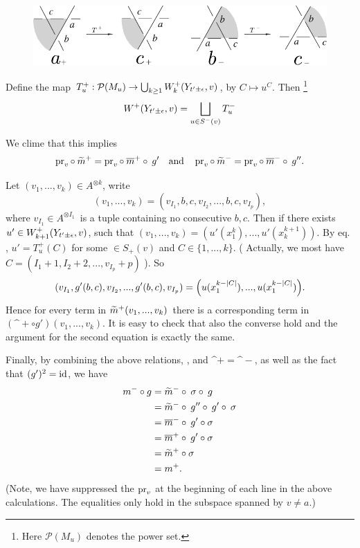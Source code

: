 \begin{figure}[h]
\centering
\includegraphics[width=.6\textwidth]{figs/move_iiib3.pdf}
\caption{}
\label{fig:move_iiib3}
\end{figure}

Define the map $T_u^+ : \mathcal{P}(M_u) \to \bigcup_{k\ge 1} W^+_k(Y_{t'\pm\epsilon},v)$,
by  $C \mapsto u^C$. Then
\footnote{Here $\mathcal{P}(M_u)$ denotes the power set.}
\begin{equation}
\label{eq:sq_union_T}
W^+(Y_{t'\pm\epsilon},v) = \bigsqcup_{u\in S^-(v)} T_u^{-} 
\end{equation}

We clime that this implies 
\begin{equation}
\label{eq:tm_as_bm_and_gm}
\operatorname{pr}_v \circ\: \widetilde{m}^+ = \operatorname{pr}_v \circ\: \overline{m}^+ \circ\: g' 
\quad\text{and}\quad \operatorname{pr}_v \circ\: \widetilde{m}^- = \operatorname{pr}_v \circ\: \overline{m}^- \circ\: g''. 
\end{equation}

Let $(v_1,...,v_k) \in A^{\otimes k}$, write 
\[ (v_1,...,v_k) = (v_{I_1}, b, c, v_{I_2}, ..., b,c, v_{I_p}), \]
where $v_{I_1} \in A^{\otimes I_1}$ is a tuple containing no
consecutive $b,c$. Then if there exists $u' \in W^+_{k+1}(Y_{t'\pm\epsilon},v)$, 
such that $(v_1,...,v_k) = (u'(x^k_1), ..., u'(x^{k+1}_{k}))$. By 
eq. , $u' = T_u^+(C)$ for some $\in S_+(v)$ and $C \in \{
1,...,k\}$. ( Actually, we most have $C = (I_1+1, I_2+2, ..., v_{I_p} + p)$ ). So 
\[ (v_{I_1}, g'(b,c),v_{I_2},...,g'(b,c),v_{I_p}) =
\qty(u(x^{k-|C|}_1),...,u(x^{k-|C|}_1)). \]
Hence for every term in $\widetilde{m}^+(v_1,...,v_k)$ there is a corresponding term in
$(\bm^+ \circ g')(v_1,...,v_k)$. It is easy to check that also the converse
hold and the argument for the second equation is exactly the same.

Finally, by combining the above relations, ,
 and $\bm^+ = \bm^-$, as well as the fact that
$(g')^2 = \operatorname{id}$, we have 
%
\begin{align*}
m^- \circ g 
&= \widetilde{m}^- \circ\: \sigma \circ\: g \\
&= \widetilde{m}^- \circ\: g'' \circ\: g' \circ\: \sigma \\
&= \overline{m}^- \circ\: g' \circ \sigma  \\
&= \overline{m}^+ \circ\: g' \circ \sigma  \\
&= \widetilde{m}^+ \circ \sigma   \\
&= m^+.
\end{align*}
(Note, we have suppressed the $\operatorname{pr}_v$ at the beginning of each line in the above
calculations. The equalities only hold in the subspace spanned by $v\ne a$.)


